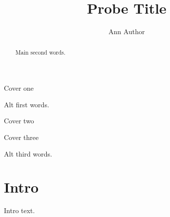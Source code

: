 \documentclass{smfart}
\title{Probe Title}\author{Ann Author}
\begin{document}
\maketitle
\begin{center}Cover one\end{center}
\begin{altabstract}Alt first words.\end{altabstract}
\begin{center}Cover two\end{center}
\begin{abstract}Main second words.\end{abstract}
\begin{center}Cover three\end{center}
\begin{altabstract}Alt third words.\end{altabstract}
\section{Intro}
Intro text.
\end{document}
